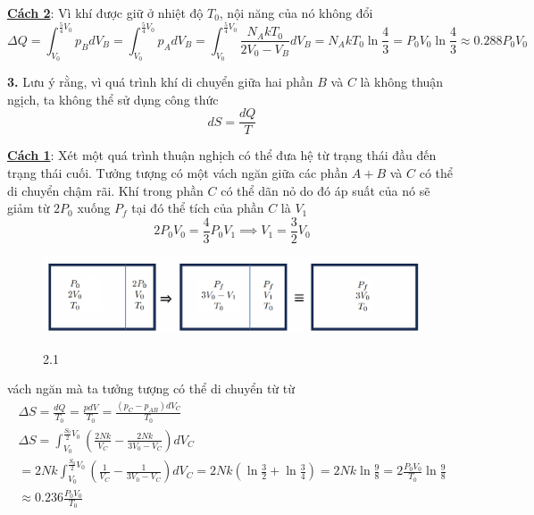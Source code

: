 \noindent\underline{\textbf{Cách 2}}: Vì khí được giữ ở nhiệt độ $T_0$, nội năng của nó không đổi
\begin{equation*}
  \Delta Q=\int_{V_{0}}^{\frac{5}{4}V_{0}}p_{B}dV_{B}=\int_{V_{0}}^{\frac{5}{4}V_{0}}p_{A}dV_{B}=\int_{V_{0}}^{\frac{5}{4}V_{0}}\frac{N_{A}kT_{0}}{2V_{0}-V_{B}}dV_{B}=N_{A}kT_{0}\ln\frac{4}{3}=P_{0}V_{0}\ln\frac{4}{3}\approx0.288P_{0}V_{0}
\end{equation*}

\noindent\textbf{3.} Lưu ý rằng, vì quá trình khí di chuyển giữa hai phần $B$ và $C$ là không thuận ngịch, ta không thể sử dụng công thức
\begin{equation*}
  dS=\frac{dQ}{T}
\end{equation*}

\noindent\underline{\textbf{Cách 1}}: Xét một quá trình thuận nghịch có thể đưa hệ từ trạng thái đầu đến trạng thái cuối. Tưởng tượng có một vách ngăn giữa các phần $A+B$ và $C$ có thể di chuyển chậm rãi. Khí trong phần $C$ có thể dãn nỏ do đó áp suất của nó sẽ giảm từ $2P_0$ xuống $P_f$ tại đó thể tích của phần $C$ là $V_1$
\begin{equation*}
  2P_0V_0=\frac{4}{3}P_0V_1\implies V_1=\frac{3}{2}V_0
\end{equation*}
\begin{figure}[h]
  \centering
  \includegraphics[width=1\textwidth]{Figures/Solutions/Fig 2.1.png}
  \begin{center}
    \figurename{ 2.1}
  \end{center}
\end{figure}

\noindent vách ngăn mà ta tưởng tượng có thể di chuyển từ từ
\begin{equation*}
  \begin{gathered}
    \Delta S=\frac{dQ}{T_{0}}=\frac{pdV}{T_{0}}=\frac{(p_{C}-p_{AB})dV_{C}}{T_{0}} \\
    \Delta S=\int_{V_{0}}^{\frac{S_{0}}{2}V_{0}}\left(\frac{2Nk}{V_{C}}-\frac{2Nk}{3V_{0}-V_{C}}\right)dV_{C}\\
    =2Nk\int_{V_{0}}^{\frac{S_{0}}{2}V_{0}}\left(\frac{1}{V_{C}}-\frac{1}{3V_{0}-V_{C}}\right)dV_{C}=2Nk\left(\ln\frac{3}{2}+\ln\frac{3}{4}\right)=2Nk\ln\frac{9}{8}=2\frac{P_{0}V_{0}}{T_{0}}\ln\frac{9}{8} \\
    \approx0.236\frac{P_{0}V_{0}}{T_{0}}
  \end{gathered}
\end{equation*}

